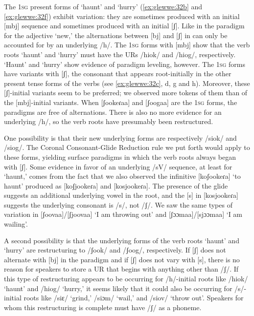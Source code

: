 \documentclass[output=paper]{langsci/langscibook}
\begin{document}
The 1\textsc{sg} present forms of ‘haunt’ and ‘hurry’ (\ref{ex:glewwe:32b} and \ref{ex:glewwe:32f}) exhibit variation: they are sometimes produced with an initial [mbj] sequence and sometimes produced with an initial [ʃ]. Like in the paradigm for the adjective ‘new,’ the alternations between [bj] and [ʃ] in  can only be accounted for by an underlying /h/. The 1\textsc{sg} forms with [mbj] show that the verb roots ‘haunt’ and ‘hurry’ must have the URs /hiok/ and /hiog/, respectively. ‘Haunt’ and ‘hurry’ show evidence of paradigm leveling, however. The 1\textsc{sg} forms have variants with [ʃ], the consonant that appears root-initially in the other present tense forms of the verbs (see \ref{ex:glewwe:32c}, d, g and h). Moreover, these [ʃ]-initial variants seem to be preferred; we observed more tokens of them than of the [mbj]-initial variants. When [ʃookeɾaa] and [ʃoogaa] are the 1\textsc{sg} forms, the paradigms are free of alternations. There is also no more evidence for an underlying /h/, so the verb roots have presumably been restructured. 

One possibility is that their new underlying forms are respectively /siok/ and /siog/. The Coronal Consonant-Glide Reduction rule we put forth would apply to these forms, yielding surface paradigms in which the verb roots always began with [ʃ]. Some evidence in favor of an underlying /sV/ sequence, at least for ‘haunt,’ comes from the fact that we also observed the infinitive [koʃookeɾa] ‘to haunt’ produced as [koʃjookeɾa] and [kosjookeɾa]. The presence of the glide suggests an additional underlying vowel in the root, and the [s] in [kosjookeɾa] suggests the underlying consonant is /s/, not /ʃ/. We saw the same types of variation in [ʃoovaa]/[ʃjoovaa] ‘I am throwing out’ and [ʃɔɔmaa]/[sjɔɔmaa] ‘I am wailing’. 

A second possibility is that the underlying forms of the verb roots ‘haunt’ and ‘hurry’ are restructuring to /ʃook/ and /ʃoog/, respectively. If [ʃ] does not alternate with [bj] in the paradigm and if [ʃ] does not vary with [s], there is no reason for speakers to store a UR that begins with anything other than /ʃ/. If this type of restructuring appears to be occurring for /h/-initial roots like /hiok/ ‘haunt’ and /hiog/ ‘hurry,’ it seems likely that it could also be occurring for /s/-initial roots like /siɛ/ ‘grind,’ /siɔm/ ‘wail,’ and /siov/ ‘throw out’. Speakers for whom this restructuring is complete must have /ʃ/ as a phoneme. 
\end{document}
